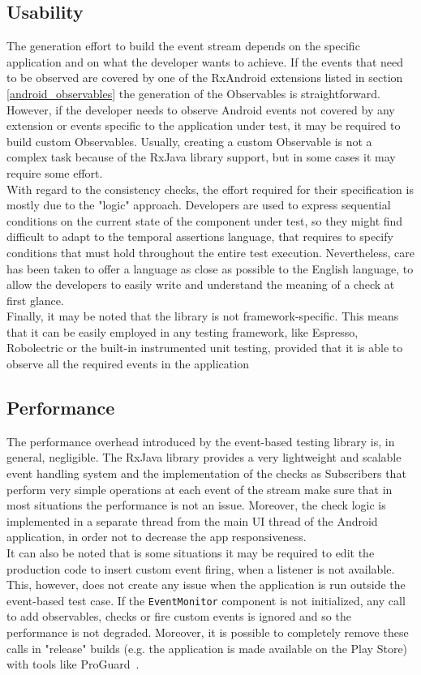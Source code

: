 \documentclass[11pt,a4paper,notitlepage]{article}
\begin{document}
{\subsection{Usability}
The generation effort to build the event stream depends on the specific application and on what the developer wants to achieve. If the events that need to be observed are covered by one of the RxAndroid extensions listed in section \ref{android_observables} the generation of the Observables is straightforward. However, if the developer needs to observe Android events not covered by any extension or events specific to the application under test, it may be required to build custom Observables. Usually, creating a custom Observable is not a complex task because of the RxJava library support, but in some cases it may require some effort.\medskip \\
With regard to the consistency checks, the effort required for their specification is mostly due to the "logic" approach. Developers are used to express sequential conditions on the current state of the component under test, so they might find difficult to adapt to the temporal assertions language, that requires to specify conditions that must hold throughout the entire test execution. Nevertheless, care has been taken to offer a language as close as possible to the English language, to allow the developers to easily write and understand the meaning of a check at first glance.\medskip \\
Finally, it may be noted that the library is not framework-specific. This means that it can be easily employed in any testing framework, like Espresso, Robolectric or the built-in instrumented unit testing, provided that it is able to observe all the required events in the application

\subsection{Performance}
The performance overhead introduced by the event-based testing library is, in general, negligible. The RxJava library provides a very lightweight and scalable event handling system and the implementation of the checks as Subscribers that perform very simple operations at each event of the stream make sure that in most situations the performance is not an issue. Moreover, the check logic is implemented in a separate thread from the main UI thread of the Android application, in order not to decrease the app responsiveness.\medskip \\
It can also be noted that is some situations it may be required to edit the production code to insert custom event firing, when a listener is not available. This, however, does not create any issue when the application is run outside the event-based test case. If the \texttt{EventMonitor} component is not initialized, any call to add observables, checks or fire custom events is ignored and so the performance is not degraded. Moreover, it is possible to completely remove these calls in "release" builds (e.g. the application is made available on the Play Store) with tools like ProGuard~\cite{ProGuard}.

}
\end{document}
